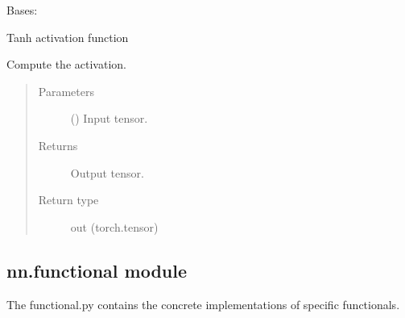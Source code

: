 \documentclass[letterpaper,10pt,english]{sphinxmanual}
\begin{document}
\begin{fulllineitems}
\label{\detokenize{nn:nn.activation.Tanh}}
Bases: {\hyperref[\detokenize{nn:nn.activation.Activation}]{}}

Tanh activation function

\begin{fulllineitems}
\label{\detokenize{nn:nn.activation.Tanh.forward}}
Compute the activation.
\begin{quote}\begin{description}
\item[{Parameters}] \leavevmode
{} () \textendash{} Input tensor.

\item[{Returns}] \leavevmode
Output tensor.

\item[{Return type}] \leavevmode
out (torch.tensor)

\end{description}\end{quote}

\end{fulllineitems}


\end{fulllineitems}



\subsection{nn.functional module}
\label{\detokenize{nn:module-nn.functional}}\label{\detokenize{nn:nn-functional-module}}
The functional.py contains the concrete implementations of specific functionals.
\end{document}
